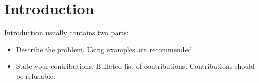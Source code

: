 \section{Introduction}
\label{sec:introduction}

Introduction usually contains two parts:
\begin{itemize}
\item Describe the problem. Using examples are recommended.
\item State your contributions. Bulleted list of contributions. Contributions should be refutable.
\end{itemize}


